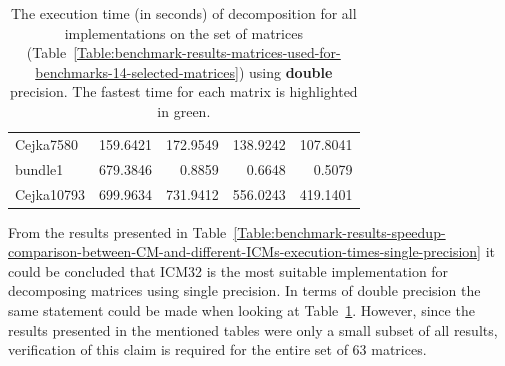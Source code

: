 \begin{table}[h!]
\begin{tabular}{|>{\footnotesize}l|>{\raggedleft\arraybackslash\footnotesize}r|>{\raggedleft\arraybackslash\footnotesize}r|>{\raggedleft\arraybackslash\footnotesize}r|>{\raggedleft\arraybackslash\footnotesize}r|}
		Cejka7580		&                   159.6421 &                   172.9549 &                   138.9242 & \cellcolor{green!25}107.8041 \\
		bundle1         &                   679.3846 &                     0.8859 &                     0.6648 & \cellcolor{green!25}  0.5079 \\
		Cejka10793      &                   699.9634 &                   731.9412 &                   556.0243 & \cellcolor{green!25}419.1401 \\ \hline
	\end{tabular}
	\caption{The execution time (in seconds) of decomposition for all implementations on the set of matrices (Table~\ref{Table:benchmark-results-matrices-used-for-benchmarks-14-selected-matrices}) using \textbf{double} precision. The fastest time for each matrix is highlighted in green.}
	\label{Table:benchmark-results-speedup-comparison-between-CM-and-different-ICMs-execution-times-double-precision}
\end{table}

From the results presented in Table~\ref{Table:benchmark-results-speedup-comparison-between-CM-and-different-ICMs-execution-times-single-precision} it could be concluded that ICM32 is the most suitable implementation for decomposing matrices using single precision. In terms of double precision the same statement could be made when looking at Table~\ref{Table:benchmark-results-speedup-comparison-between-CM-and-different-ICMs-execution-times-double-precision}. However, since the results presented in the mentioned tables were only a small subset of all results, verification of this claim is required for the entire set of 63 matrices.

